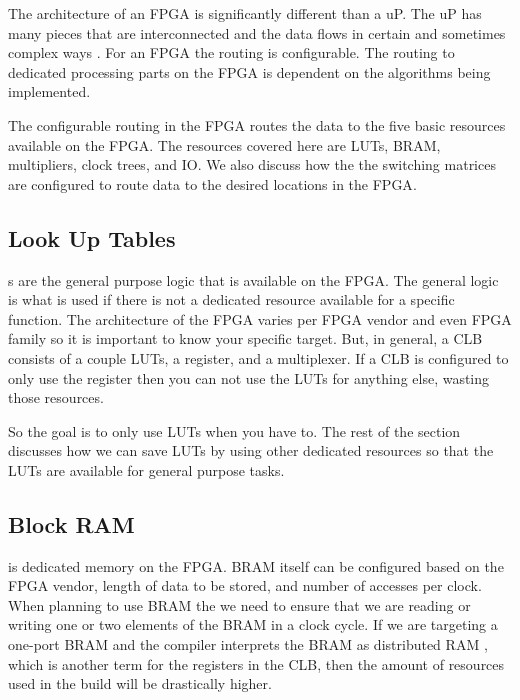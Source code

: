 The architecture of an \ac{FPGA} is significantly different than a \ac{uP}. The \ac{uP} has many pieces that are interconnected and the data flows in certain and sometimes complex ways \cite{furber1996arm}. For an \ac{FPGA} the routing is configurable. The routing to dedicated processing parts on the \ac{FPGA} is dependent on the algorithms being implemented. 

The configurable routing in the \ac{FPGA} routes the data to the five basic resources available on the \ac{FPGA}. The resources covered here are \ac{LUT}s, \ac{BRAM}, multipliers, clock trees, and \ac{IO}. We also discuss how the the switching matrices are configured to route data to the desired locations in the \ac{FPGA}.

\subsection{Look Up Tables}

s are the general purpose logic that is available on the \ac{FPGA}. The general logic is what is used if there is not a dedicated resource available for a specific function. The architecture of the \ac{FPGA} varies per \ac{FPGA} vendor and even \ac{FPGA} family so it is important to know your specific target. But, in general, a \ac{CLB} consists of a couple \ac{LUT}s, a register, and a multiplexer. If a \ac{CLB} is configured to only use the register then you can not use the \ac{LUT}s for anything else, wasting those resources. 

So the goal is to only use \ac{LUT}s when you have to. The rest of the section discusses how we can save \ac{LUT}s by using other dedicated resources so that the \ac{LUT}s are available for general purpose tasks.	
	
\subsection{Block RAM}
	
 is dedicated memory on the \ac{FPGA}. \ac{BRAM} itself can be configured based on the \ac{FPGA} vendor, length of data to be stored, and number of accesses per clock. When planning to use \ac{BRAM} the we need to ensure that we are reading or writing one or two elements of the \ac{BRAM} in a clock cycle. If we are targeting a one-port \ac{BRAM} and the compiler interprets the \ac{BRAM} as distributed \ac{RAM} , which is another term for the registers in the \ac{CLB}, then the amount of resources used in the build will be drastically higher.

